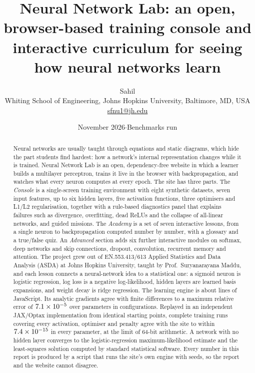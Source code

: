 \documentclass[11pt,a4paper]{article}
\title{\textbf{Neural Network Lab: an open, browser-based training console and interactive curriculum for seeing how neural networks learn}}
\author{Sahil\\[2pt]
\small Whiting School of Engineering, Johns Hopkins University, Baltimore, MD, USA\\
\small \href{mailto:sfnu1@jh.edu}{sfnu1@jh.edu}}
\date{\small November 2026\quad$\cdot$\quad Benchmarks run \buildDate}
\newcommand{\courseName}{EN.553.413/613 Applied Statistics and Data Analysis (ASDA)}
\newcommand{\profName}{Prof.\ Suryanarayana Maddu}
\begin{document}
\maketitle

\begin{abstract}
\noindent
Neural networks are usually taught through equations and static diagrams, which hide the part students find hardest: how a network's internal representation changes while it is trained. Neural Network Lab is an open, dependency-free website in which a learner builds a multilayer perceptron, trains it live in the browser with backpropagation, and watches what every neuron computes at every epoch. The site has three parts. The \emph{Console} is a single-screen training environment with eight synthetic datasets, seven input features, up to six hidden layers, five activation functions, three optimisers and L1/L2 regularisation, together with a rule-based diagnostics panel that explains failures such as divergence, overfitting, dead ReLUs and the collapse of all-linear networks, and \nMissions{} guided missions. The \emph{Academy} is a set of seven interactive lessons, from a single neuron to backpropagation computed number by number, with a glossary and a true/false quiz. An \emph{Advanced} section adds six further interactive modules on softmax, deep networks and skip connections, dropout, convolution, recurrent memory and attention. The project grew out of \courseName{} at Johns Hopkins University, taught by \profName{}, and each lesson connects a neural-network idea to a statistical one: a sigmoid neuron is logistic regression, log loss is a negative log-likelihood, hidden layers are learned basis expansions, and weight decay is ridge regression. The learning engine is about \nnLines{} lines of JavaScript. Its analytic gradients agree with finite differences to a maximum relative error of $7.1\times 10^{-5}$ over \gcParams{} parameters in \gcCases{} configurations. Replayed in an independent JAX/Optax implementation from identical starting points, \xcRuns{} complete training runs covering every activation, optimiser and penalty agree with the site to within $7.4\times 10^{-15}$ in every parameter, at the limit of 64-bit arithmetic. A network with no hidden layer converges to the logistic-regression maximum-likelihood estimate and the least-squares solution computed by standard statistical software. Every number in this report is produced by a script that runs the site's own engine with \nSeeds{} seeds, so the report and the website cannot disagree.
\end{abstract}
\end{document}

